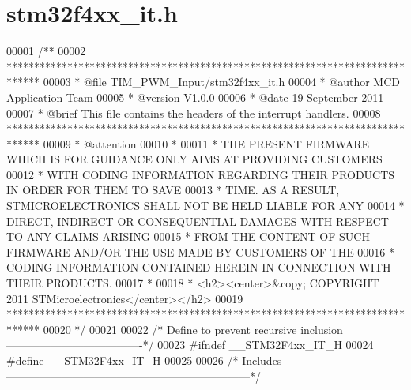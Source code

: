 \section{stm32f4xx\+\_\+it.\+h}
\label{stm32f4xx__it_8h_source}

\begin{DoxyCode}
00001 \textcolor{comment}{/**}
00002 \textcolor{comment}{  ******************************************************************************}
00003 \textcolor{comment}{  * @file    TIM\_PWM\_Input/stm32f4xx\_it.h }
00004 \textcolor{comment}{  * @author  MCD Application Team}
00005 \textcolor{comment}{  * @version V1.0.0}
00006 \textcolor{comment}{  * @date    19-September-2011}
00007 \textcolor{comment}{  * @brief   This file contains the headers of the interrupt handlers.}
00008 \textcolor{comment}{  ******************************************************************************}
00009 \textcolor{comment}{  * @attention}
00010 \textcolor{comment}{  *}
00011 \textcolor{comment}{  * THE PRESENT FIRMWARE WHICH IS FOR GUIDANCE ONLY AIMS AT PROVIDING CUSTOMERS}
00012 \textcolor{comment}{  * WITH CODING INFORMATION REGARDING THEIR PRODUCTS IN ORDER FOR THEM TO SAVE}
00013 \textcolor{comment}{  * TIME. AS A RESULT, STMICROELECTRONICS SHALL NOT BE HELD LIABLE FOR ANY}
00014 \textcolor{comment}{  * DIRECT, INDIRECT OR CONSEQUENTIAL DAMAGES WITH RESPECT TO ANY CLAIMS ARISING}
00015 \textcolor{comment}{  * FROM THE CONTENT OF SUCH FIRMWARE AND/OR THE USE MADE BY CUSTOMERS OF THE}
00016 \textcolor{comment}{  * CODING INFORMATION CONTAINED HEREIN IN CONNECTION WITH THEIR PRODUCTS.}
00017 \textcolor{comment}{  *}
00018 \textcolor{comment}{  * <h2><center>&copy; COPYRIGHT 2011 STMicroelectronics</center></h2>}
00019 \textcolor{comment}{  ******************************************************************************}
00020 \textcolor{comment}{  */}
00021 
00022 \textcolor{comment}{/* Define to prevent recursive inclusion -------------------------------------*/}
00023 \textcolor{preprocessor}{#}\textcolor{preprocessor}{ifndef} \textcolor{preprocessor}{\_\_STM32F4xx\_IT\_H}
00024 \textcolor{preprocessor}{#}\textcolor{preprocessor}{define} \textcolor{preprocessor}{\_\_STM32F4xx\_IT\_H}
00025 
00026 \textcolor{comment}{/* Includes ------------------------------------------------------------------*/}

\end{DoxyCode}
